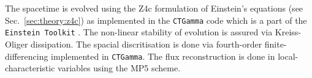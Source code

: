 The spacetime is evolved using the Z4c formulation of Einstein's equations
(see Sec.~\ref{sec:theory:z4c}) as implemented in the \texttt{CTGamma} code
\citep{Pollney:2009yz,Reisswig:2013sqa}
which is a part of the \texttt{Einstein Toolkit} \citep{Loffler:2011ay}.
%
%
The non-linear stability of evolution is assured via Kreiss-Oliger dissipation. 
The spacial discritisation is done via fourth-order finite-differencing implemented in \texttt{CTGamma}.
%
The flux reconstruction is done in local-characteristic variables using the \ac{MP5} scheme.

%

